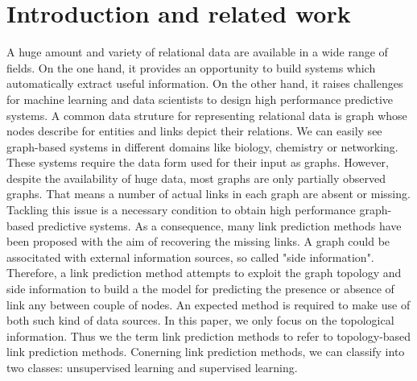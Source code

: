 \documentclass[runningheads,a4paper]{llncs}
\begin{document}
\section{Introduction and related work}
A huge amount and variety of relational data are available in a wide range of fields. On the one hand, it provides an opportunity to build systems which automatically extract useful information. On the other hand, it raises challenges for machine learning and data scientists to design high performance predictive systems. A common data struture for representing relational data is graph whose nodes describe for entities and links depict their relations. We can easily see graph-based systems in different domains like biology, chemistry or networking. These systems require the data form used for their input as graphs. However, despite the availability of huge data, most graphs are only partially observed graphs. That means a number of actual links in each graph are absent or missing. Tackling this issue is a necessary condition to obtain high performance graph-based predictive systems. As a consequence, many link prediction methods have been proposed with the aim of recovering the missing links. A graph could be associtated with external information sources, so called "side information". Therefore, a link prediction method attempts to exploit the graph topology and side information to build a the model for predicting the presence or absence of link any between couple of nodes. An expected method is required to make use of both such kind of data sources. In this paper, we only focus on the topological information. Thus we the term link prediction methods to refer to topology-based link prediction methods. Conerning link prediction methods, we can classify into two classes: unsupervised learning and supervised learning. 
\end{document}
